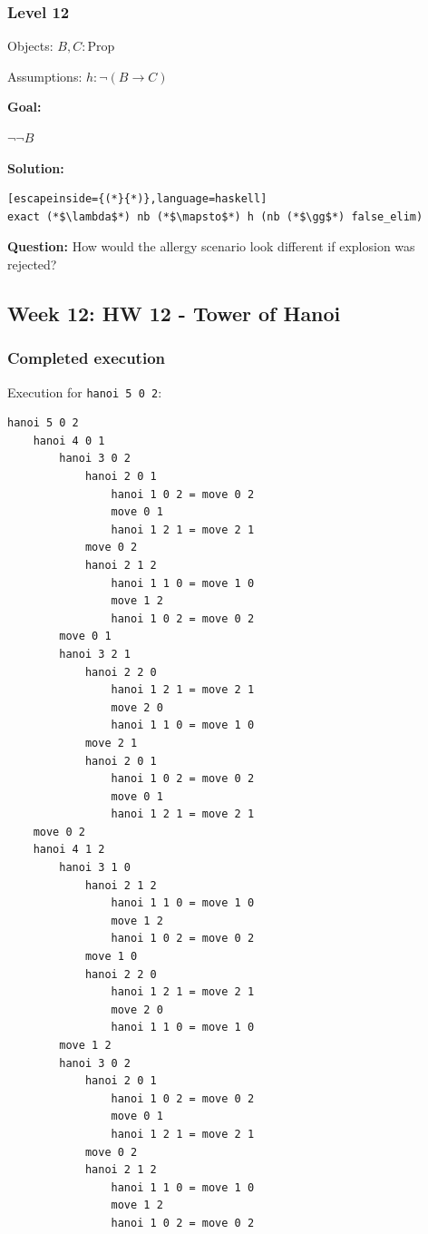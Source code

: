 \documentclass{article}
\theoremstyle{theorem}
\theoremstyle{definition}
\theoremstyle{remark}
\begin{document}
\subsubsection{Level 12}

Objects:
$B, C: \text{Prop}$

Assumptions:
$h: \neg(B \to C)$

\textbf{Goal:}

$\neg\neg B$

\textbf{Solution:}
\begin{lstlisting}[escapeinside={(*}{*)},language=haskell]
exact (*$\lambda$*) nb (*$\mapsto$*) h (nb (*$\gg$*) false_elim)
\end{lstlisting}

\textbf{Question:}
How would the allergy scenario look different if explosion was rejected?

\subsection{Week 12: HW 12 - Tower of Hanoi}

\subsubsection{Completed execution}

Execution for \texttt{hanoi 5 0 2}:

\begin{verbatim}
hanoi 5 0 2
    hanoi 4 0 1
        hanoi 3 0 2
            hanoi 2 0 1
                hanoi 1 0 2 = move 0 2
                move 0 1
                hanoi 1 2 1 = move 2 1
            move 0 2
            hanoi 2 1 2
                hanoi 1 1 0 = move 1 0
                move 1 2
                hanoi 1 0 2 = move 0 2
        move 0 1
        hanoi 3 2 1
            hanoi 2 2 0
                hanoi 1 2 1 = move 2 1
                move 2 0
                hanoi 1 1 0 = move 1 0
            move 2 1
            hanoi 2 0 1
                hanoi 1 0 2 = move 0 2
                move 0 1
                hanoi 1 2 1 = move 2 1
    move 0 2
    hanoi 4 1 2
        hanoi 3 1 0
            hanoi 2 1 2
                hanoi 1 1 0 = move 1 0
                move 1 2
                hanoi 1 0 2 = move 0 2
            move 1 0
            hanoi 2 2 0
                hanoi 1 2 1 = move 2 1
                move 2 0
                hanoi 1 1 0 = move 1 0
        move 1 2
        hanoi 3 0 2
            hanoi 2 0 1
                hanoi 1 0 2 = move 0 2
                move 0 1
                hanoi 1 2 1 = move 2 1
            move 0 2
            hanoi 2 1 2
                hanoi 1 1 0 = move 1 0
                move 1 2
                hanoi 1 0 2 = move 0 2
\end{verbatim}
\end{document}
